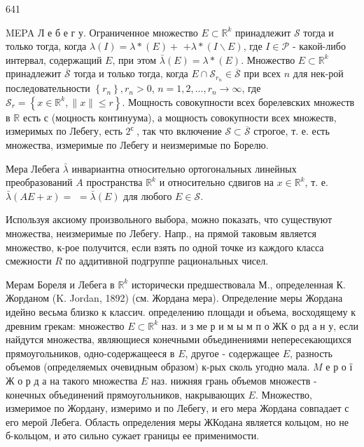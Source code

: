 \documentclass[10pt]{article}
\begin{document}
641



MEPA Л е б е г у. Ограниченное множество $E \subset \mathbb{R}^{k}$ принадлежит $\mathscr{\mathscr { S }}$ тогда и только тогда, когда $\lambda(I)=\lambda *(E)+$ $+\lambda *(I \backslash E)$, где $I \in \mathscr{P}$ - какой-либо интервал, содержащий $E$, при этом $\bar{\lambda}(E)=\lambda *(E)$. Множество $E \subset \mathbb{R}^{k}$ принадлежит $\overline{\mathscr{S}}$ тогда и только тогда, когда $E \cap \mathscr{S}_{r_{n}} \in \overline{\mathscr{S}}$ при всех $n$ для нек-рой последовательности $\left\{r_{n}\right\}, r_{n}>0$, $n=1,2, \ldots, r_{n} \rightarrow \infty$, где $\mathscr{S}_{r}=\left\{x \in \mathbb{R}^{k},\|x\| \leqslant r\right\}$. Мощность совокупности всех борелевских множеств в $\mathbb{R}$ есть с (моцность континуума), а мощность совокупности всех множеств, измеримых по Лебегу, есть $2^{\text {с }}$, так что включение $\mathscr{S} \subset \overline{\mathscr{S}}$ строгое, т. е. есть множества, измеримые по Лебегу и неизмеримые по Борелю.



Мера Лебега $\bar{\lambda}$ инвариантна относительно ортогональных линейных преобразований $A$ пространства $\mathbb{R}^{k}$ и относительно сдвигов на $x \in \mathbb{R}^{k}$, т. е. $\bar{\lambda}(A E+x)=$ $=\bar{\lambda}(E)$ для любого $E \in \mathscr{S}$.



Используя аксиому произвольного выбора, можно показать, что существуют множества, неизмеримые по Лебегу. Напр., на прямой таковым является множество, к-рое получится, если взять по одной точке из каждого класса смежности $R$ по аддитивной подгруппе рациональных чисел.



Мерам Бореля и Лебега в $\mathbb{R}^{k}$ исторически предшествовала М., определенная К. Жорданом (K. Jordan, 1892) (см. Жордана мера). Определение меры Жордана идейно весьма близко к классич. определению площади и объема, восходящему к древним грекам: множество $E \subset \mathbb{R}^{k}$ наз. и з ме р и м ы м п о ЖК о рд а н у, если найдутся множества, являющиеся конечными объединениями непересекающихся прямоугольников, одно-содержащееся в $E$, другое - содержащее $E$, разность объемов (определяемых очевидным образом) к-рых сколь угодно мала. $M$ е р о ї Ж о р д а на такого множества $E$ наз. нижняя грань объемов множеств - конечных объединений прямоугольников, накрывающих $E$. Множество, измеримое по Жордану, измеримо и по Лебегу, и его мера Жордана совпадает с его мерой Лебега. Область определения меры ЖКодана является кольцом, но не б-кольцом, и әто сильно сужает границы ее применимости.
\end{document}
